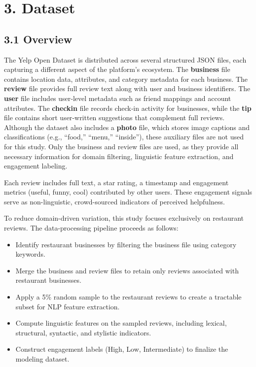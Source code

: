 \documentclass[
]{article}
\begin{document}
\hypertarget{dataset}{%
\section{3. Dataset}\label{dataset}}

\hypertarget{overview}{%
\subsection{3.1 Overview}\label{overview}}

The Yelp Open Dataset is distributed across several structured JSON
files, each capturing a different aspect of the platform's ecosystem.
The \textbf{business} file contains location data, attributes, and
category metadata for each business. The \textbf{review} file provides
full review text along with user and business identifiers. The
\textbf{user} file includes user‑level metadata such as friend mappings
and account attributes. The \textbf{checkin} file records check‑in
activity for businesses, while the \textbf{tip} file contains short
user‑written suggestions that complement full reviews. Although the
dataset also includes a \textbf{photo} file, which stores image captions
and classifications (e.g., ``food,'' ``menu,'' ``inside''), these
auxiliary files are not used for this study. Only the business and
review files are used, as they provide all necessary information for
domain filtering, linguistic feature extraction, and engagement
labeling.

Each review includes full text, a star rating, a timestamp and
engagement metrics (useful, funny, cool) contributed by other users.
These engagement signals serve as non-linguistic, crowd-sourced
indicators of perceived helpfulness.

To reduce domain-driven variation, this study focuses exclusively on
restaurant reviews. The data-processing pipeline proceeds as follows:

\begin{itemize}  

\item Identify restaurant businesses by filtering the business file using category keywords.
\item Merge the business and review files to retain only reviews associated with restaurant businesses.
\item Apply a 5\% random sample to the restaurant reviews to create a tractable subset for NLP feature extraction.
\item Compute linguistic features on the sampled reviews, including lexical, structural, syntactic, and stylistic indicators.
\item Construct engagement labels (High, Low, Intermediate) to finalize the modeling dataset.

\end{itemize}
\end{document}
